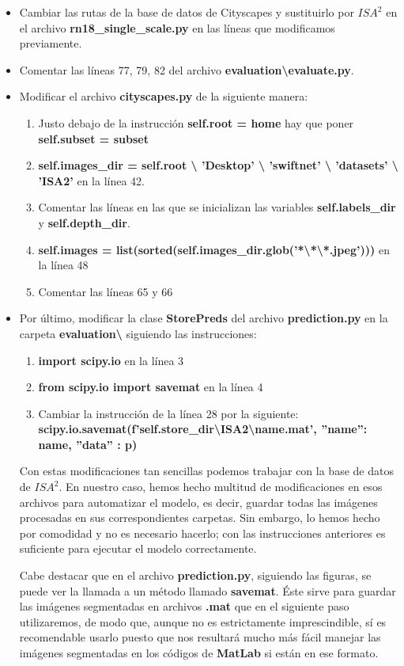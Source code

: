 \begin{itemize}
\item Cambiar las rutas de la base de datos de Cityscapes y sustituirlo por $ISA^{2}$ en el archivo \textbf{rn18\_single\_scale.py} en las líneas que modificamos previamente.
\item Comentar las líneas 77, 79, 82 del archivo \textbf{evaluation\textbackslash{evaluate.py}}.
\item Modificar el archivo \textbf{cityscapes.py} de la siguiente manera:

\begin{enumerate}
\item Justo debajo de la instrucción \textbf{self.root = home} hay que poner \textbf{self.subset = subset}
\item \textbf{self.images\_dir = self.root \textbackslash{} 'Desktop' \textbackslash{} 'swiftnet' \textbackslash{} 'datasets' \textbackslash{} 'ISA2'} en la línea 42.
\item Comentar las líneas en las que se inicializan las variables \textbf{self.labels\_dir} y \textbf{self.depth\_dir}.
\item \textbf{self.images = list(sorted(self.images\_dir.glob('*\textbackslash{*}\textbackslash{*.jpeg}')))} en la línea 48
\item Comentar las líneas 65 y 66
\end{enumerate}

\item Por último, modificar la clase \textbf{StorePreds} del archivo \textbf{prediction.py} en la carpeta \textbf{evaluation\textbackslash{}} siguiendo las instrucciones:

\begin{enumerate}
\item \textbf{import scipy.io} en la línea 3
\item \textbf{from scipy.io import savemat} en la línea 4
\item Cambiar la instrucción de la línea 28 por la siguiente: \textbf{scipy.io.savemat(f'{self.store\_dir}\textbackslash{ISA2}\textbackslash{{name}.mat}', {''name'': name, ''data'' : p})}
\end{enumerate}

Con estas modificaciones tan sencillas podemos trabajar con la base de datos de $ISA^{2}$. En nuestro caso, hemos hecho multitud de modificaciones en esos archivos para automatizar el modelo, es decir, guardar todas las imágenes procesadas en sus correspondientes carpetas. Sin embargo, lo hemos hecho por comodidad y no es necesario hacerlo; con las instrucciones anteriores es suficiente para ejecutar el modelo correctamente.

Cabe destacar que en el archivo \textbf{prediction.py}, siguiendo las figuras, se puede ver la llamada a un método llamado \textbf{savemat}. Éste sirve para guardar las imágenes segmentadas en archivos \textbf{.mat} que en el siguiente paso utilizaremos, de modo que, aunque no es estrictamente imprescindible, sí es recomendable usarlo puesto que nos resultará mucho más fácil manejar las imágenes segmentadas en los códigos de \textbf{MatLab} \cite{matlab} si están en ese formato.

\end{itemize}

